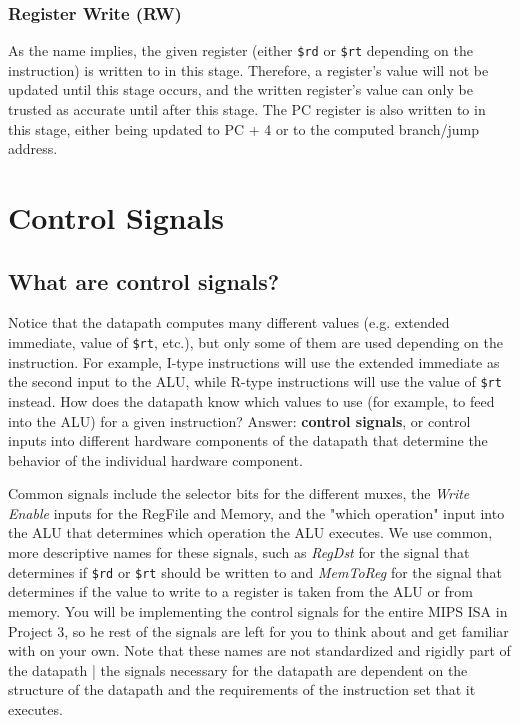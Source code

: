 \documentclass{article}
\begin{document}
\subsubsection{Register Write (RW)}
As the name implies, the given register (either \texttt{\$rd} or \texttt{\$rt} depending on the instruction) is written to in this stage.  Therefore, a register's value will not be updated until this stage occurs, and the written register's value can only be trusted as accurate until after this stage.  The PC register is also written to in this stage, either being updated to PC + 4 or to the computed branch/jump address.

\section{Control Signals}
\subsection{What are control signals?}
Notice that the datapath computes many different values (e.g. extended immediate, value of \texttt{\$rt}, etc.), but only some of them are used depending on the instruction. For example, I-type instructions will use the extended immediate as the second input to the ALU, while R-type instructions will use the value of \texttt{\$rt} instead. How does the datapath know which values to use (for example, to feed into the ALU) for a given instruction? Answer: \textbf{control signals}, or control inputs into different hardware components of the datapath that determine the behavior of the individual hardware component. 

Common signals include the selector bits for the different muxes, the \textit{Write Enable} inputs for the RegFile and Memory, and the "which operation" input into the ALU that determines which operation the ALU executes. We use common, more descriptive names for these signals, such as \textit{RegDst} for the signal that determines if \texttt{\$rd} or \texttt{\$rt} should be written to and \textit{MemToReg} for the signal that determines if the value to write to a register is taken from the ALU or from memory. You will be implementing the control signals for the entire MIPS ISA in Project 3, so he rest of the signals are left for you to think about and get familiar with on your own. Note that these names are not standardized and rigidly part of the datapath | the signals necessary for the datapath are dependent on the structure of the datapath and the requirements of the instruction set that it executes. 
\end{document}
